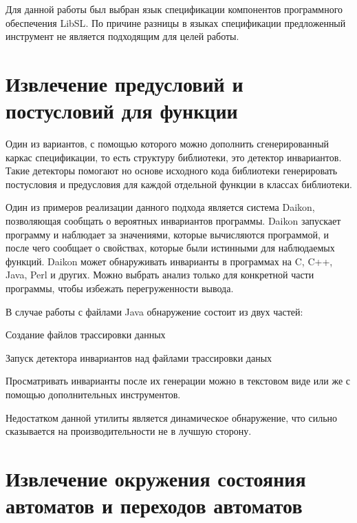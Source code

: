 Для данной работы был выбран язык спецификации компонентов программного обеспечения LibSL\cite{libsl}\cite{libsl2}. По причине разницы в языках спецификации предложенный инструмент не является подходящим для целей работы.

\section{Извлечение предусловий и постусловий для функции}

Один из вариантов, с помощью которого можно дополнить сгенерированный каркас спецификации, то есть структуру библиотеки, это детектор инвариантов. Такие детекторы помогают но основе исходного кода библиотеки генерировать постусловия и предусловия для каждой отдельной функции в классах библиотеки.

Один из примеров реализации данного подхода является система Daikon\cite{daikon}\cite{daikon_paper}, позволяющая сообщать о вероятных инвариантов программы. Daikon запускает программу и наблюдает за значениями, которые вычисляются программой, и после чего сообщает о свойствах, которые были истинными для наблюдаемых функций.
Daikon может обнаруживать инварианты в программах на C, C++, Java, Perl и других. Можно выбрать анализ только для конкретной части программы, чтобы избежать перегруженности вывода.

В случае работы с файлами Java обнаружение состоит из двух частей:
%
\begin{itemize*}
\item Создание файлов трассировки данных
\item Запуск детектора инвариантов над файлами трассировки даных
\end{itemize*}
%
Просматривать инварианты после их генерации можно в текстовом виде или же с помощью дополнительных инструментов.

Недостатком данной утилиты является динамическое обнаружение, что сильно сказывается на производительности не в лучшую сторону.

\section{Извлечение окружения состояния автоматов и переходов автоматов}

